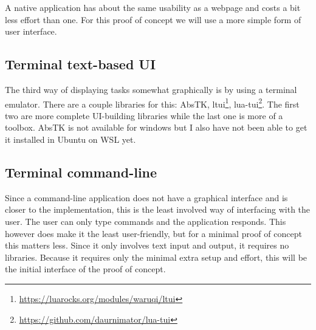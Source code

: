 A native application has about the same usability as a webpage and costs a bit less effort than one. For this proof of concept we will use a more simple form of user interface.

\subsection{Terminal text-based UI}
The third way of displaying tasks somewhat graphically is by using a terminal emulator. There are a couple libraries for this:
AbsTK,
ltui\footnote{\url{https://luarocks.org/modules/waruqi/ltui}},
lua-tui\footnote{\url{https://github.com/daurnimator/lua-tui}}. The first two are more complete UI-building libraries while the last one is more of a toolbox. AbsTK is not available for windows but I also have not been able to get it installed in Ubuntu on WSL yet.

\subsection{Terminal command-line}
Since a command-line application does not have a graphical interface and is closer to the implementation, this is the least involved way of interfacing with the user. The user can only type commands and the application responds. This however does make it the least user-friendly, but for a minimal proof of concept this matters less. Since it only involves text input and output, it requires no libraries. Because it requires only the minimal extra setup and effort, this will be the initial interface of the proof of concept.
